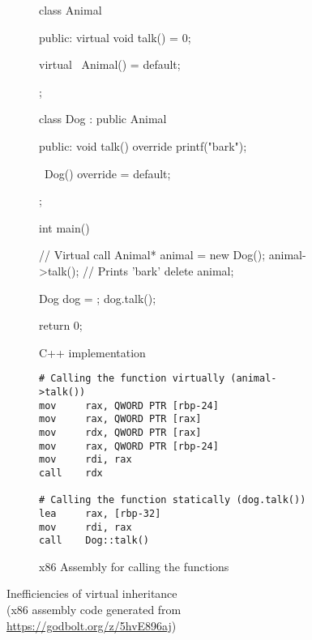 \begin{figure}[ht]
    \centering
    \begin{subfigure}{0.49\linewidth}%
        \begin{cppcode}
class Animal {
public:
    virtual void talk() = 0;

    virtual ~Animal() = default;
};

class Dog : public Animal {
public:
    void talk() override {
        printf("bark\n");
    }

    ~Dog() override = default;
};

int main() {
    // Virtual call
    Animal* animal = new Dog();
    animal->talk(); // Prints 'bark'
    delete animal;

    Dog dog = {};
    dog.talk();

    return 0;
}
        \end{cppcode}
        \caption{C++ implementation}
    \end{subfigure}%
    \begin{subfigure}{0.49\linewidth}%
        \begin{verbatim}
# Calling the function virtually (animal->talk())
mov     rax, QWORD PTR [rbp-24]
mov     rax, QWORD PTR [rax]
mov     rdx, QWORD PTR [rax]
mov     rax, QWORD PTR [rbp-24]
mov     rdi, rax
call    rdx
        
# Calling the function statically (dog.talk())
lea     rax, [rbp-32]
mov     rdi, rax
call    Dog::talk()
        \end{verbatim}
        \caption{x86 Assembly for calling the functions}
    \end{subfigure}%
    \caption{Inefficiencies of virtual inheritance\\(x86 assembly code generated from \url{https://godbolt.org/z/5hvE896aj})}
    \label{fig:virtual_inheritance}
\end{figure}